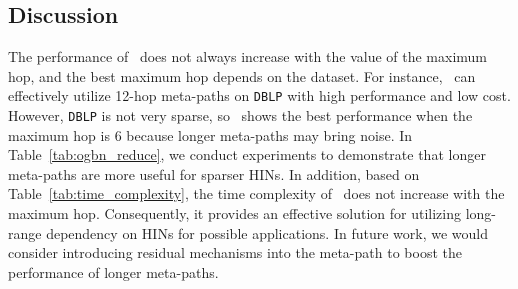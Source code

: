   
\subsection{Discussion}
The performance of \model~does not always increase with the value of the maximum hop, and the best maximum hop depends on the dataset. For instance, \model~can effectively utilize 12-hop meta-paths on \texttt{DBLP} with high performance and low cost.
However, \texttt{DBLP} is not very sparse, so \model~shows the best performance when the maximum hop is $6$ because longer meta-paths may bring noise. In Table~\ref{tab:ogbn_reduce}, we conduct experiments to demonstrate that longer meta-paths are more useful for sparser HINs. 
In addition, based on Table~\ref{tab:time_complexity}, the time complexity of \model~does not increase with the maximum hop. Consequently, it provides an effective solution for utilizing long-range dependency on HINs for possible applications. In future work, we would consider introducing residual mechanisms into the meta-path to boost the performance of longer meta-paths.





 